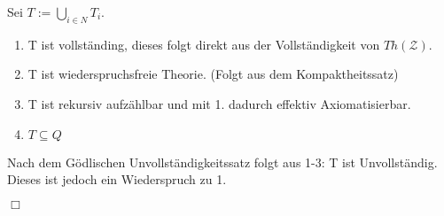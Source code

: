 \documentclass[12pt]{article}
\begin{document}
Sei $T:=\bigcup_{i\in N}T_i$.

\begin{enumerate}
  \item T ist vollständing, dieses folgt direkt aus der Vollständigkeit von $Th(\mathcal{Z})$.
  \item T ist wiederspruchsfreie Theorie. (Folgt aus dem Kompaktheitssatz)
  \item T ist rekursiv aufzählbar und mit 1. dadurch effektiv Axiomatisierbar.
  \item $T\subseteq Q$
\end{enumerate}

Nach dem Gödlischen Unvollständigkeitssatz folgt aus 1-3: T ist Unvollständig.
Dieses ist jedoch ein Wiederspruch zu 1.

\begin{flushright} $\Box$ \end{flushright}

%
%
%
%
%
%
%
%
%
\end{document}
